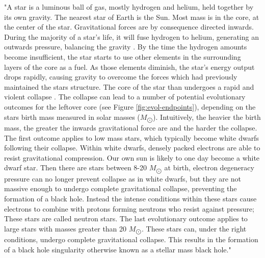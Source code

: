 "A star is a luminous ball of gas, mostly hydrogen and helium, held together by its own gravity. The nearest star of Earth is the Sun. Most mass is in the core, at the center of the star. Gravitational forces are by consequence directed inwards. During the majority of a star's life, it will fuse hydrogen to helium, generating an outwards pressure, balancing the gravity \citep{ghosh}. By the time the hydrogen amounts become insufficient, the star starts to use other elements in the surrounding layers of the core as a fuel. As those elements diminish, the star's energy output drops rapidly, causing gravity to overcome the forces which had previously maintained the stars structure. The core of the star than undergoes a rapid and violent collapse \citep{ghosh}. The collapse can lead to a number of potential evolutionary outcomes for the leftover core (see Figure \ref{fig:evol-endpoints}), depending on the stars birth mass measured in solar masses ($M_{\bigodot}$). Intuitively, the heavier the birth mass, the greater the inwards gravitational force are and the harder the collapse. The first outcome applies to low mass stars, which typically become white dwarfs following their collapse. Within white dwarfs, densely packed electrons are able to resist gravitational compression. Our own sun is likely to one day become a white dwarf star. Then there are stars between 8-20 $M_{\bigodot}$ at birth, electron degeneracy pressure can no longer prevent collapse as in white dwarfs, but they are not massive enough to undergo complete gravitational collapse, preventing the formation of a black hole. Instead the intense conditions within these stars cause electrons to combine with protons forming neutrons who resist against pressure; These stars are called neutron stars. The last evolutionary outcome applies to large stars with masses greater than 20 $M_{\bigodot}$. These stars can, under the right conditions, undergo complete gravitational collapse. This results in the formation of a black hole singularity otherwise known as a stellar mass black hole."
